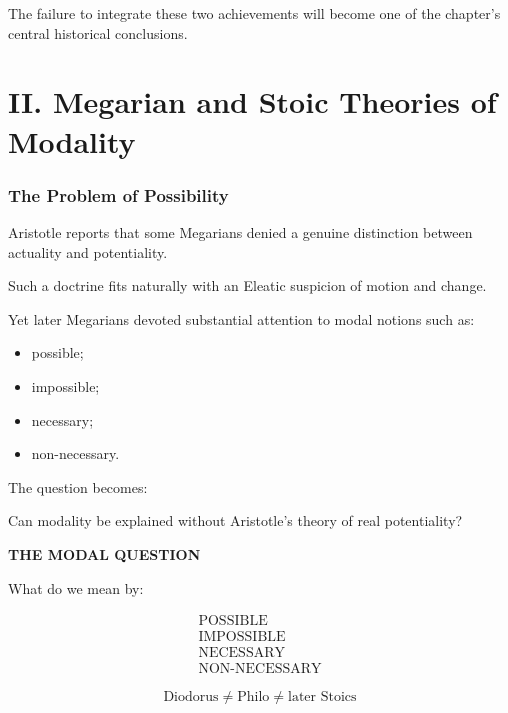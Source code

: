 \documentclass[11pt]{article}
\begin{document}
The failure to integrate these two achievements will become one
of the chapter's central historical conclusions.


\part*{II. Megarian and Stoic Theories of Modality}

\section{The Problem of Possibility}

Aristotle reports that some Megarians denied a genuine
distinction between actuality and potentiality.

Such a doctrine fits naturally with an Eleatic suspicion of
motion and change.

Yet later Megarians devoted substantial attention to modal
notions such as:

\begin{itemize}
    \item possible;
    \item impossible;
    \item necessary;
    \item non-necessary.
\end{itemize}

The question becomes:

\begin{center}
Can modality be explained without Aristotle's theory of real
potentiality?
\end{center}

\begin{whiteboard}
\textbf{THE MODAL QUESTION}

What do we mean by:

\[
\begin{array}{c}
\text{POSSIBLE}\\
\text{IMPOSSIBLE}\\
\text{NECESSARY}\\
\text{NON-NECESSARY}
\end{array}
\]

\[
\boxed{\text{Diodorus} \neq \text{Philo} \neq \text{later Stoics}}
\]
\end{whiteboard}
\end{document}
